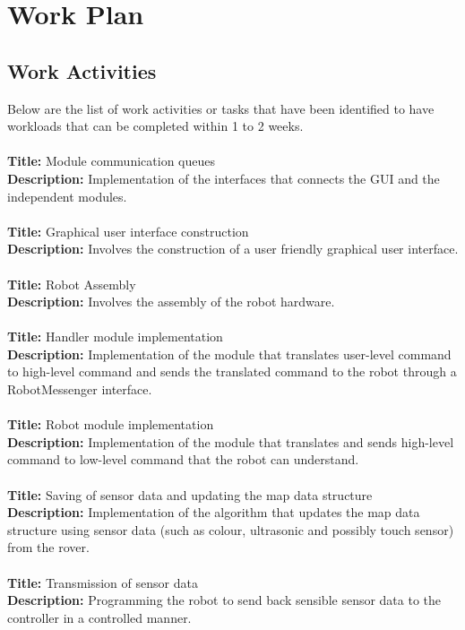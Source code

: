 \documentclass[12pt,a4paper]{article}
\begin{document}
	\newpage
	
	\section{Work Plan}
	\subsection{Work Activities}
    Below are the list of work activities or tasks that have been identified to have workloads that can be completed within 1 to 2 weeks.\\ \\
	\textbf{Title: }Module communication queues\\
	\textbf{Description: }Implementation of the interfaces that connects the GUI and the independent modules.\\ \\
	\textbf{Title: }Graphical user interface construction\\
	\textbf{Description: }Involves the construction of a user friendly graphical user interface.\\ \\
	\textbf{Title: }Robot Assembly\\
	\textbf{Description: }Involves the assembly of the robot hardware.\\ \\
	\textbf{Title: }Handler module implementation\\
	\textbf{Description: }Implementation of the module that translates user-level command to high-level command and sends the translated command to the robot through a RobotMessenger interface.\\ \\
	\textbf{Title: }Robot module implementation\\
	\textbf{Description: }Implementation of the module that translates and sends high-level command to low-level command that the robot can understand.\\ \\
	\textbf{Title: }Saving of sensor data and updating the map data structure\\
	\textbf{Description: }Implementation of the algorithm that updates the map data structure using sensor data (such as colour, ultrasonic and possibly touch sensor) from the rover.\\ \\
	\textbf{Title: }Transmission of sensor data\\
	\textbf{Description: }Programming the robot to send back sensible sensor data to the controller in a controlled manner.\\ \\
\end{document}
